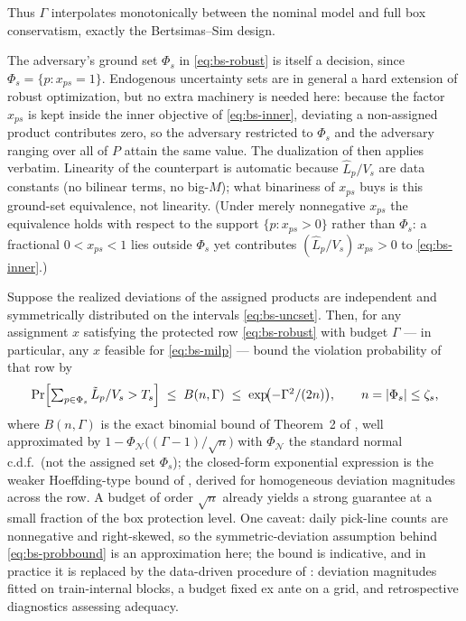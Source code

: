 Thus $\Gamma$ interpolates monotonically between the nominal model and full
box conservatism, exactly the Bertsimas--Sim design.

\begin{remark}
\label{rem:bs-endogenous}
The adversary's ground set $\Phi_s$ in \eqref{eq:bs-robust} is itself a
decision, since $\Phi_s = \{p : x_{ps} = 1\}$. Endogenous uncertainty sets
are in general a hard extension of robust optimization, but no extra
machinery is needed here: because the factor $x_{ps}$ is kept inside the
inner objective of \eqref{eq:bs-inner}, deviating a non-assigned product
contributes zero, so the adversary restricted to $\Phi_s$ and the adversary
ranging over all of $P$ attain the same value. The dualization of
 then applies verbatim. Linearity of the
counterpart is automatic because $\hat L_p / V_s$ are data constants (no
bilinear terms, no big-$M$); what binariness of $x_{ps}$ buys is this
ground-set equivalence, not linearity. (Under merely nonnegative $x_{ps}$
the equivalence holds with respect to the support $\{p : x_{ps} > 0\}$
rather than $\Phi_s$: a fractional $0 < x_{ps} < 1$ lies outside $\Phi_s$
yet contributes $(\hat L_p / V_s)\, x_{ps} > 0$ to \eqref{eq:bs-inner}.)
\end{remark}

\begin{remark}
\label{rem:bs-prob}
Suppose the realized deviations of the assigned products are independent and
symmetrically distributed on the intervals \eqref{eq:bs-uncset}. Then, for
any assignment $x$ satisfying the protected row \eqref{eq:bs-robust} with
budget $\Gamma$ --- in particular, any $x$ feasible for \eqref{eq:bs-milp}
--- \citet{bertsimas2004} bound the violation probability of that row by
\begin{equation}
\Pr\Bigl[\textstyle\sum_{p \in \Phi_s} \tilde L_p / V_s > T_s\Bigr]
\;\le\; B(n, \Gamma) \;\le\; \exp\!\bigl(-\Gamma^2 / (2n)\bigr),
\qquad n = |\Phi_s| \le \zeta_s,
\label{eq:bs-probbound}
\end{equation}
where $B(n, \Gamma)$ is the exact binomial bound of Theorem~2 of
\citet{bertsimas2004}, well approximated by
$1 - \Phi_{\mathcal N}\bigl((\Gamma - 1)/\sqrt{n}\bigr)$ with
$\Phi_{\mathcal N}$ the standard normal c.d.f.\ (not the assigned set
$\Phi_s$); the closed-form exponential expression is the weaker
Hoeffding-type bound of \citet{bertsimas2003robust}, derived for homogeneous
deviation magnitudes across the row. A budget of order $\sqrt{n}$ already
yields a strong guarantee at a small fraction of the box protection level.
One caveat: daily pick-line counts are nonnegative and right-skewed, so the
symmetric-deviation assumption behind \eqref{eq:bs-probbound} is an
approximation here; the bound is indicative, and in practice it is replaced
by the data-driven procedure of : deviation magnitudes
fitted on train-internal blocks, a budget fixed ex ante on a grid, and
retrospective diagnostics assessing adequacy.
\end{remark}

